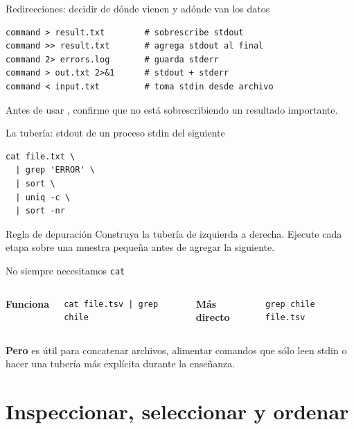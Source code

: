 \documentclass[aspectratio=169,11pt]{beamer}
\begin{document}
\begin{frame}[fragile]{Redirecciones: decidir de dónde vienen y adónde van los datos}
\begin{lstlisting}
command > result.txt        # sobrescribe stdout
command >> result.txt       # agrega stdout al final
command 2> errors.log       # guarda stderr
command > out.txt 2>&1      # stdout + stderr
command < input.txt         # toma stdin desde archivo
\end{lstlisting}
  \vspace{4mm}
  \quad Antes de usar \term{>}, confirme que no está sobrescribiendo un resultado importante.
\end{frame}

\begin{frame}[fragile]{La tubería: stdout de un proceso \textrightarrow{} stdin del siguiente}
\begin{lstlisting}
cat file.txt \
  | grep 'ERROR' \
  | sort \
  | uniq -c \
  | sort -nr
\end{lstlisting}
  \vspace{4mm}
  \begin{wideblock}{Regla de depuración}
    Construya la tubería de izquierda a derecha. Ejecute cada etapa sobre una muestra pequeña antes de agregar la siguiente.
  \end{wideblock}
\end{frame}

\begin{frame}[fragile]{No siempre necesitamos \texttt{cat}}
  \begin{columns}[T,onlytextwidth]
      \textbf{Funciona}
\begin{lstlisting}
cat file.tsv | grep chile
\end{lstlisting}
      \textbf{Más directo}
\begin{lstlisting}
grep chile file.tsv
\end{lstlisting}
  \end{columns}
  \vspace{6mm}
  \small
  \textbf{Pero}  es útil para concatenar archivos, alimentar comandos que sólo leen stdin o hacer una tubería más explícita durante la enseñanza.
\end{frame}

\section{Inspeccionar, seleccionar y ordenar}
\end{document}
